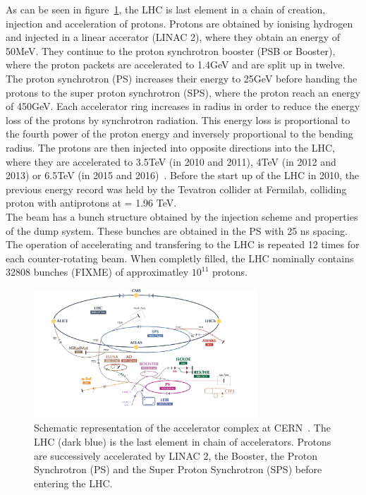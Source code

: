  As can be seen in figure~\ref{fig:LHCchain}, the LHC is last element in a chain of creation, injection and acceleration of protons. Protons are obtained by ionising hydrogen and injected in a linear accerator (LINAC 2), where they obtain an energy of 50\si{ \MeV}. They continue to the proton synchrotron booster (PSB or Booster), where the proton packets are accelerated to 1.4\si{ \GeV} and are split up in twelve. The proton synchrotron (PS) increases their energy to 25\si{ \GeV} before handing the protons to the super proton synchrotron (SPS), where the proton reach an energy of 450\si{ \GeV}. Each accelerator ring increases in radius in order to reduce the energy loss of the protons by synchrotron radiation. This energy loss is proportional to the fourth power of the proton energy and inversely proportional to the bending radius. The protons are then injected into opposite directions into the LHC, where they are accelerated to 3.5\si{ \TeV} (in 2010 and 2011), 4\si{ \TeV} (in 2012 and 2013) or 6.5\si{ \TeV} (in 2015 and 2016)~\cite{Wenninger:2254678}. Before the start up of the LHC in 2010, the previous energy record was held by the Tevatron collider at Fermilab, colliding proton with antiprotons at \com = 1.96 \si{ \TeV}.\\
 
 The beam has a bunch structure obtained by the injection scheme and properties of the dump system. These bunches are obtained in the PS with 25 \si{ \nano \s} spacing. The operation of accelerating and transfering to the LHC is repeated 12 times for each counter-rotating beam.  When completly filled, the LHC nominally contains 32808 bunches (FIXME) of approximatley $10^{11}$ protons. 
 
 \begin{figure}[h]
	\centering
	\includegraphics[width=0.75\textwidth]{2_ExperimentalSetup/Figures/CCC-v2016}
	\caption{Schematic representation of the accelerator complex at CERN~\cite{DeMelis:2197559}. The LHC (dark blue) is the last element in chain of accelerators. Protons are successively accelerated by LINAC 2, the Booster, the Proton Synchrotron (PS) and the Super Proton Synchrotron (SPS) before entering the LHC.}
	\label{fig:LHCchain}
\end{figure}


